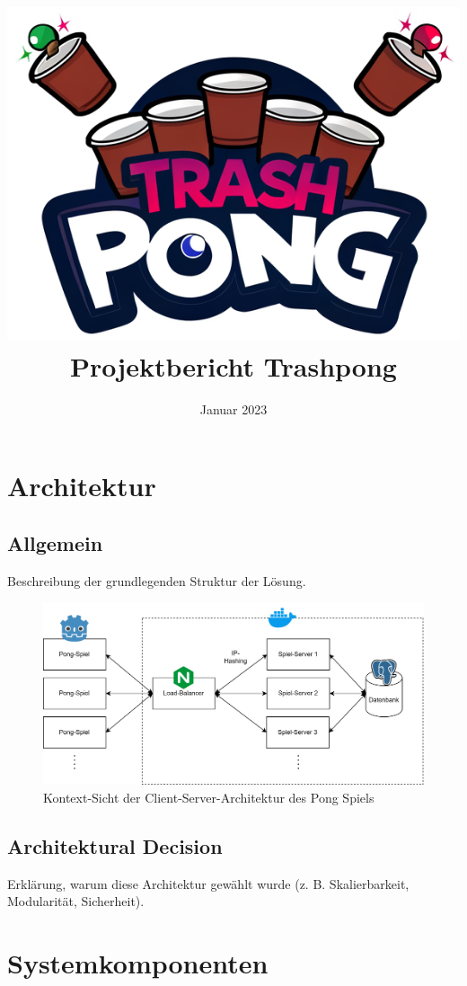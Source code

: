 \documentclass[
]{article}
\title{\includegraphics{resources/header.png} Projektbericht Trashpong}
\author{}
\date{Januar 2023}
\begin{document}
\maketitle

\hypertarget{section-introduction-and-goals}{%
\section{Architektur}\label{section-introduction-and-goals}}


\subsection{Allgemein}  
Beschreibung der grundlegenden Struktur der Lösung.
\begin{figure}[H]
	\centering
	\includegraphics[width=\textwidth ]{resources/Client-Server.drawio.png}
	\caption{Kontext-Sicht der Client-Server-Architektur des Pong Spiels}
	\label{fig:clientserer}
\end{figure}
\subsection{Architektural Decision}
Erklärung, warum diese Architektur gewählt wurde (z. B. Skalierbarkeit, Modularität, Sicherheit).

\section{Systemkomponenten}
\end{document}
